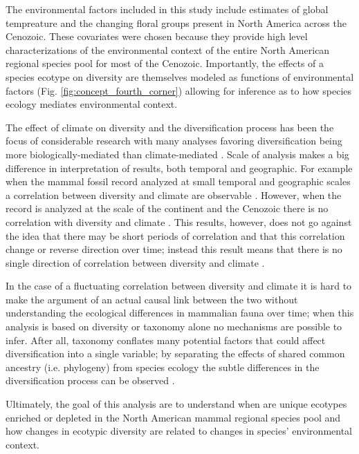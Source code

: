 \documentclass[12pt,letterpaper]{article}
\begin{document}
The environmental factors included in this study include estimates of global tempreature and the changing floral groups present in North America across the Cenozoic. These covariates were chosen because they provide high level characterizations of the environmental context of the entire North American regional species pool for most of the Cenozoic. Importantly, the effects of a species ecotype on diversity are themselves modeled as functions of environmental factors (Fig. \ref{fig:concept_fourth_corner}) allowing for inference as to how species ecology mediates environmental context. 

The effect of climate on diversity and the diversification process has been the focus of considerable research with many analyses favoring diversification being more biologically-mediated than climate-mediated \citep{Alroy1996a,Alroy2000g,Figueirido2012,Clyde1998a}. Scale of analysis makes a big difference in interpretation of results, both temporal and geographic. For example when the mammal fossil record analyzed at small temporal and geographic scales a correlation between diversity and climate are observable \citep{Clyde1998a}. However, when the record is analyzed at the scale of the continent and the Cenozoic there is no correlation with diversity and climate \citep{Alroy2000g}. This results, however, does not go against the idea that there may be short periods of correlation and that this correlation change or reverse direction over time; instead this result means that there is no single direction of correlation between diversity and climate \citep{Figueirido2012}. 

In the case of a fluctuating correlation between diversity and climate it is hard to make the argument of an actual causal link between the two without understanding the ecological differences in mammalian fauna over time; when this analysis is based on diversity or taxonomy alone no mechanisms are possible to infer. After all, taxonomy conflates many potential factors that could affect diversification into a single variable; by separating the effects of shared common ancestry (i.e. phylogeny) from species ecology the subtle differences in the diversification process can be observed \citep{Smits2015b}.










Ultimately, the goal of this analysis are to understand when are unique ecotypes enriched or depleted in the North American mammal regional species pool and how changes in ecotypic diversity are related to changes in species' environmental context.
\end{document}
